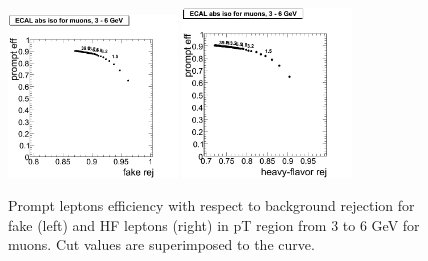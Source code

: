 \begin{figure}[htbp]
\begin{center}
 \includegraphics[width = 0.4\textwidth]{pictures/trackCut/bkgdRej_sigEff/muon_fake_ptCut0_ptCut1.png}
\includegraphics[width = 0.4\textwidth]{pictures/trackCut/bkgdRej_sigEff/muon_nonPrompt_ptCut0_ptCut1.png}
\caption{\small{Prompt leptons efficiency with respect to background 
rejection for fake (left) and HF leptons (right) in pT region
from 3 to 6 GeV for muons. 
Cut values are superimposed to the curve.}\label{fig:ecalrej_mu1}}
\end{center}
\end{figure}
